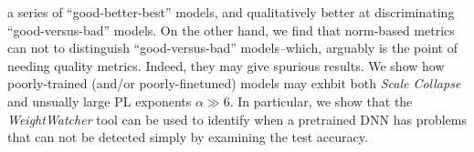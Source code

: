 a series of ``good-better-best'' models, and qualitatively better at discriminating ``good-versus-bad'' models.
On the other hand, we find that norm-based metrics can not to distinguish ``good-versus-bad'' models--which, 
arguably is the point of needing quality metrics.  Indeed, they may give spurious results.
We show how poorly-trained (and/or poorly-finetuned) models may exhbit both \emph{Scale Collapse}
and unsually large PL exponents $\alpha\gg 6$.  In particular, we show that the \emph{WeightWatcher} tool
can be used to identify when a pretrained DNN has problems that can not be detected simply
by examining the test accuracy.




